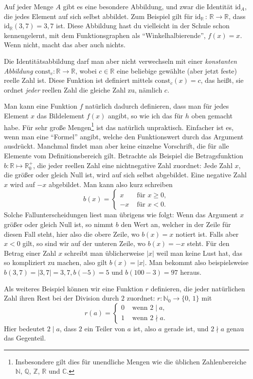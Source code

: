 \documentclass[a4paper,ngerman,12pt]{zirkelblatt1415}
\theoremstyle{definition}
\theoremstyle{remark}
\newcommand{\RR}{\mathbb{R}}
\newcommand{\CC}{\mathbb{C}}
\newcommand{\ZZ}{\mathbb{Z}}
\renewcommand{\NN}{\mathbb{N}}
\newcommand{\QQ}{\mathbb{Q}}
\newcommand{\lra}{\longrightarrow}
\newcommand{\id}{\text{id}}
\begin{document}
Auf jeder Menge $A$ gibt es eine besondere Abbildung, und zwar die Identität $\text{id}_A$, die jedes Element auf sich selbst abbildet. 
Zum Beispiel gilt für $\id_{\RR}\, : \, \RR\lra\RR$, dass $\id_{\RR}(3,7)=3,7$ ist. 
Diese Abbildung hast du vielleicht in der Schule schon kennengelernt, mit dem Funktionsgraphen als ``Winkelhalbierende'', $f(x) = x$.
Wenn nicht, macht das aber auch nichts.

Die Identitätsabbildung darf man aber nicht verwechseln mit einer \emph{konstanten Abbildung} $\text{const}_{c}:\RR\lra\RR$, wobei $c\in\RR$ eine beliebige gewählte (aber jetzt feste) reelle Zahl ist. 
Diese Funktion ist definiert mittels $\text{const}_c(x)=c$, das heißt, sie ordnet \emph{jeder} reellen Zahl die gleiche Zahl zu, nämlich $c$.

Man kann eine Funktion $f$ natürlich dadurch definieren, dass man für jedes Element $x$ das Bildelement $f(x)$ angibt,
so wie ich das für $h$ oben gemacht habe.
Für sehr große Mengen\footnote{Insbesondere gilt dies für unendliche Mengen wie die üblichen Zahlenbereiche $\NN$, $\QQ$, $\ZZ$, $\RR$ und $\CC$.} 
ist das natürlich unpraktisch.
Einfacher ist es, wenn man eine "`Formel"' angibt, welche den Funktionswert durch das Argument ausdrückt. 
Manchmal findet man aber keine einzelne Vorschrift, die für alle Elemente vom Definitionsbereich gilt. 
Betrachte als Beispiel die Betragsfunktion $b:\mathbb{R} \mapsto \mathbb{R}^+_0$, die jeder reellen Zahl eine nichtnegative Zahl zuordnet: 
Jede Zahl $x$, die größer oder gleich Null ist, wird auf sich selbst abgebildet. 
Eine negative Zahl $x$ wird auf $-x$ abgebildet. Man kann also kurz schreiben
\[ b(x) =\begin{cases} 
      x & \text{ für }x\geq 0, \\
      -x & \text{ für }x < 0.
   \end{cases}
\]
Solche Fallunterscheidungen liest man übrigens wie folgt: Wenn das Argument $x$ größer oder gleich Null ist, 
so nimmt $b$ den Wert an, welcher in der Zeile für diesen Fall steht, hier also die obere Zeile, wo $b(x)=x$ notiert ist. 
Falls aber $x<0$ gilt, so sind wir auf der unteren Zeile, wo $b(x)=-x$ steht.
Für den Betrag einer Zahl $x$ schreibt man üblicherweise $|x|$ weil man keine Lust hat, das so kompliziert zu machen,
also gilt $b(x)=|x|$. 
Man bekommt also beispielsweise $b(3,7) = |3,7| = 3,7, b(-5) = 5$ und $b(100-3) = 97$ heraus.


Als weiteres Beispiel können wir eine Funktion $r$ definieren, die jeder natürlichen Zahl ihren Rest bei der Division durch $2$ zuordnet: $r:\mathbb{N}_0 \longrightarrow \{0\text{, }1\}$ mit
\[ r(a) = 
\begin{cases}
0 & \text{ wenn }2\mid a, \\
1 & \text{ wenn }2\nmid a.
\end{cases}
\]
Hier bedeutet $2 \mid a$, dass $2$ ein Teiler von $a$ ist, also $a$ gerade ist, und $2\nmid a$ genau das Gegenteil. 
\end{document}
